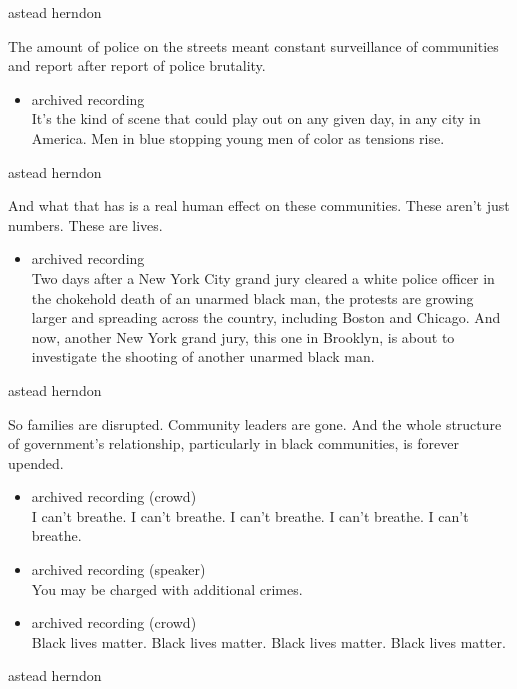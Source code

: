 astead herndon

The amount of police on the streets meant constant surveillance of
communities and report after report of police brutality.

\begin{itemize}
\tightlist
\item
  archived recording\\
  It's the kind of scene that could play out on any given day, in any
  city in America. Men in blue stopping young men of color as tensions
  rise.
\end{itemize}

astead herndon

And what that has is a real human effect on these communities. These
aren't just numbers. These are lives.

\begin{itemize}
\tightlist
\item
  archived recording\\
  Two days after a New York City grand jury cleared a white police
  officer in the chokehold death of an unarmed black man, the protests
  are growing larger and spreading across the country, including Boston
  and Chicago. And now, another New York grand jury, this one in
  Brooklyn, is about to investigate the shooting of another unarmed
  black man.
\end{itemize}

astead herndon

So families are disrupted. Community leaders are gone. And the whole
structure of government's relationship, particularly in black
communities, is forever upended.

\begin{itemize}
\item
  archived recording (crowd)\\
  I can't breathe. I can't breathe. I can't breathe. I can't breathe. I
  can't breathe.
\item
  archived recording (speaker)\\
  You may be charged with additional crimes.
\item
  archived recording (crowd)\\
  Black lives matter. Black lives matter. Black lives matter. Black
  lives matter.
\end{itemize}

astead herndon

